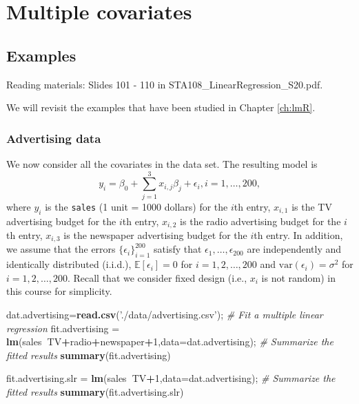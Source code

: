 \documentclass[12pt,]{book}
\newenvironment{Shaded}{\begin{snugshade}}{\end{snugshade}}
\newcommand{\KeywordTok}[1]{\textcolor[rgb]{0.13,0.29,0.53}{\textbf{#1}}}
\newcommand{\DataTypeTok}[1]{\textcolor[rgb]{0.13,0.29,0.53}{#1}}
\newcommand{\DecValTok}[1]{\textcolor[rgb]{0.00,0.00,0.81}{#1}}
\newcommand{\StringTok}[1]{\textcolor[rgb]{0.31,0.60,0.02}{#1}}
\newcommand{\CommentTok}[1]{\textcolor[rgb]{0.56,0.35,0.01}{\textit{#1}}}
\newcommand{\OperatorTok}[1]{\textcolor[rgb]{0.81,0.36,0.00}{\textbf{#1}}}
\newcommand{\NormalTok}[1]{#1}
\begin{document}
\chapter{Multiple covariates}\label{ch:multiple}

\section{Examples}\label{examples}

Reading materials: Slides 101 - 110 in
STA108\_LinearRegression\_S20.pdf.

We will revisit the examples that have been studied in Chapter
\ref{ch:lmR}.

\subsection{Advertising data}\label{advertising-data-1}

We now consider all the covariates in the data set. The resulting model
is \[
    y_i =  \beta_0 + \sum_{j=1}^3 x_{i,j} \beta_j  +  \epsilon_i, i=1,\ldots, 200,
    \] where \(y_i\) is the \texttt{sales} (1 unit = 1000 dollars) for
the \(i\)th entry, \(x_{i,1}\) is the TV advertising budget for the
\(i\)th entry, \(x_{i,2}\) is the radio advertising budget for the
\(i\)th entry, \(x_{i,3}\) is the newspaper advertising budget for the
\(i\)th entry. In addition, we assume that the errors
\(\{\epsilon_i\}_{i=1}^{200}\) satisfy that
\(\epsilon_1,\ldots, \epsilon_200\) are independently and identically
distributed (i.i.d.), \(\mathbb{E}[\epsilon_i]= 0\) for
\(i=1,2,\ldots, 200\) and \(\mathrm{var}(\epsilon_i)=\sigma^2\) for
\(i=1,2,\ldots, 200\). Recall that we consider fixed design (i.e.,
\(x_i\) is not random) in this course for simplicity.

\begin{Shaded}
\begin{Highlighting}[]
\NormalTok{dat.advertising=}\KeywordTok{read.csv}\NormalTok{(}\StringTok{'./data/advertising.csv'}\NormalTok{);}
\CommentTok{# Fit a multiple linear regression}
\NormalTok{fit.advertising =}\StringTok{ }\KeywordTok{lm}\NormalTok{(sales}\OperatorTok{~}\NormalTok{TV}\OperatorTok{+}\NormalTok{radio}\OperatorTok{+}\NormalTok{newspaper}\OperatorTok{+}\DecValTok{1}\NormalTok{,}\DataTypeTok{data=}\NormalTok{dat.advertising); }
\CommentTok{# Summarize the fitted results}
\KeywordTok{summary}\NormalTok{(fit.advertising) }

\NormalTok{fit.advertising.slr =}\StringTok{ }\KeywordTok{lm}\NormalTok{(sales}\OperatorTok{~}\NormalTok{TV}\OperatorTok{+}\DecValTok{1}\NormalTok{,}\DataTypeTok{data=}\NormalTok{dat.advertising); }
\CommentTok{# Summarize the fitted results}
\KeywordTok{summary}\NormalTok{(fit.advertising.slr) }
\end{Highlighting}
\end{Shaded}
\end{document}
